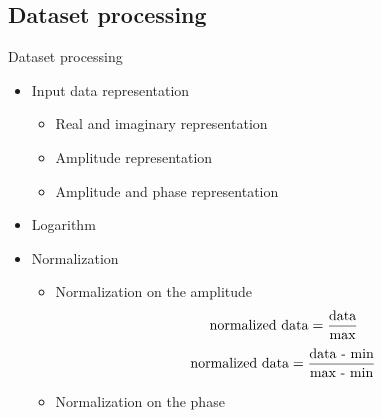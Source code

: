 \documentclass{beamer}
\newcounter{section}
\begin{document}
\subsection{Dataset processing}

\begin{frame}[t]{Dataset processing}
    \begin{itemize}
    	\item Input data representation
            \begin{itemize}
                \vspace{0.2\baselineskip}
                \item Real and imaginary representation
                \vspace{0.2\baselineskip}
                \item Amplitude representation
                \vspace{0.2\baselineskip}
                \item Amplitude and phase representation
            \end{itemize}
        \vspace{0.5\baselineskip}
        \item Logarithm
        \vspace{0.5\baselineskip}
        \item Normalization
            \begin{itemize}
                \vspace{0.2\baselineskip}
                \item Normalization on the amplitude
                \begin{equation}
                    \centering
                    \text{normalized data} = \frac{\text{data}}{\text{max}}
                \end{equation}
                \begin{equation}
                    \centering
                    \text{normalized data} = \frac{\text{data - min}}{\text{max - min}}
                \end{equation}
                \vspace{0.2\baselineskip}
                \item Normalization on the phase
            \end{itemize}
    \end{itemize}

\end{frame}
\end{document}
